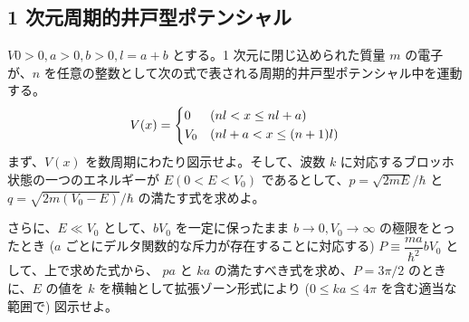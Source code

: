\documentclass[uplatex,dvipdfmx,a4paper,11pt]{jlreq}
\numberwithin{equation}{section}
\theoremstyle{definition}
\begin{document}
\subsection{1 次元周期的井戸型ポテンシャル}
\begin{problem}
$V0 > 0, a > 0, b > 0, l = a + b$ とする。1 次元に閉じ込められた質量 $m$ の電子が、$n$ を任意の整数として次の式で表される周期的井戸型ポテンシャル中を運動する。
\begin{align}
  V(x) = \begin{dcases}
           0   & (nl < x \leq nl + a)       \\
           V_0 & (nl + a < x \leq (n + 1)l)
         \end{dcases}
\end{align}
まず、$V(x)$ を数周期にわたり図示せよ。そして、波数 $k$ に対応するブロッホ状態の一つのエネルギーが $E (0 < E < V_0)$ であるとして、$p = \sqrt{2mE}/\hbar$ と $q = \sqrt{2m(V_0 - E)}/\hbar$ の満たす式を求めよ。

さらに、$E\ll V_0$ として、$bV_0$ を一定に保ったまま $b \to 0, V_0 \to \infty$ の極限をとったとき ($a$ ごとにデルタ関数的な斥力が存在することに対応する) $P ≡ \dfrac{ma}{\hbar^2}bV_0$ として、上で求めた式から、 $pa$ と $ka$ の満たすべき式を求め、$P = 3\pi/2$ のときに、$E$ の値を $k$ を横軸として拡張ゾーン形式により ($0 \leq ka \leq 4\pi$ を含む適当な範囲で) 図示せよ。

\end{problem}
\end{document}
